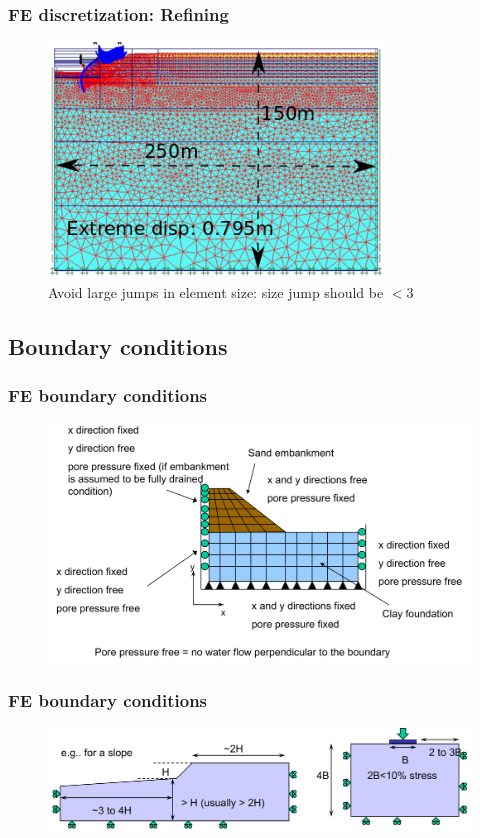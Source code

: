 \documentclass[notes]{beamer}
\begin{document}
\begin{frame}
\frametitle{FE discretization: Refining}
\begin{figure}[ht]
	\centering
	\includegraphics[width=0.8\textwidth]{figs/refined-mesh.png}
	\caption*{Avoid large jumps in element size: size jump should be $< 3$}
\end{figure}
\end{frame}

\subsection{Boundary conditions}
\begin{frame}
\frametitle{FE boundary conditions}
\begin{figure}[ht]
	\centering
	\includegraphics[width=\textwidth]{figs/boundary-conditions.png}
\end{figure}
\end{frame}

\begin{frame}
\frametitle{FE boundary conditions}
\begin{figure}[ht]
	\centering
	\includegraphics[width=\textwidth]{figs/fe-boundaries.png}
\end{figure}
\end{frame}
\end{document}
